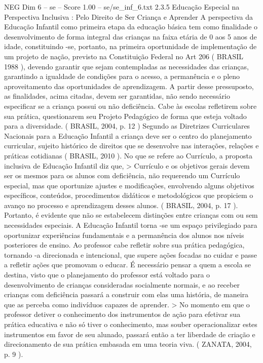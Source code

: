 \begin{textsample}{NEG Dim 6 – se – Score 1.00 – se/se\_inf\_6.txt}  \label{ex:f6_neg_247}
2.3.5 Educação Especial na Perspectiva Inclusiva : Pelo Direito de Ser Criança e Aprender A perspectiva da Educação Infantil como primeira etapa da educação básica tem como finalidade o desenvolvimento de forma integral das crianças na faixa etária de 0 aos 5 anos de idade, constituindo -se, portanto, na primeira oportunidade de implementação de um projeto de nação, previsto na Constituição Federal no Art 206 ( BRASIL 1988 ), devendo garantir que sejam contempladas as necessidades das crianças, garantindo a igualdade de condições para o acesso, a permanência e o pleno aproveitamento das oportunidades de aprendizagem.
A partir desse pressuposto, as finalidades, acima citadas, devem ser garantidas, não sendo necessário especificar se a criança possui ou não deficiência.
Cabe às escolas refletirem sobre sua prática, questionarem seu Projeto Pedagógico de forma que esteja voltado para a diversidade. ( BRASIL, 2004, p. 12 ) Segundo as Diretrizes Curriculares Nacionais para a Educação Infantil a criança deve ser o centro do planejamento curricular, sujeito histórico de direitos que se desenvolve nas interações, relações e práticas cotidianas ( BRASIL, 2010 ).
No que se refere ao Currículo, a proposta inclusiva de Educação Infantil diz que, > Currículo e os objetivos gerais devem ser os mesmos para os alunos com deficiência, não requerendo um Currículo especial, mas que oportunize ajustes e modificações, envolvendo alguns objetivos específicos, conteúdos, procedimentos didáticos e metodológicos que propiciem o avanço no processo e aprendizagem desses alunos. ( BRASIL, 2004, p. 17 ).
Portanto, é evidente que não se estabelecem distinções entre crianças com ou sem necessidades especiais.
A Educação Infantil torna -se um espaço privilegiado para oportunizar experiências fundamentais e a permanência dos alunos nos níveis posteriores de ensino.
Ao professor cabe refletir sobre sua prática pedagógica, tornando -a direcionada e intencional, que supere ações focadas no cuidar e passe a refletir ações que promovam o educar.
É necessário pensar a quem a escola se destina, visto que o planejamento do professor está voltado para o desenvolvimento de crianças consideradas socialmente normais, e ao receber crianças com deficiência passará a construir com elas uma história, de maneira que as perceba como indivíduos capazes de aprender. > No momento em que o professor detiver o conhecimento dos instrumentos de ação para efetivar sua prática educativa e não só tiver o conhecimento, mas souber operacionalizar estes instrumentos em favor de seu alunado, passará então a ter liberdade de criação e direcionamento de sua prática embasada em uma teoria viva. ( ZANATA, 2004, p. 9 ).

\end{textsample}
